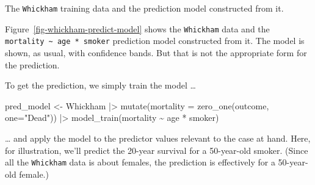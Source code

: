 \documentclass[
  letterpaper,
  DIV=11,
  numbers=noendperiod,
  oneside]{scrartcl}
\newenvironment{Shaded}{\begin{snugshade}}{\end{snugshade}}
\newcommand{\AttributeTok}[1]{\textcolor[rgb]{0.40,0.45,0.13}{#1}}
\newcommand{\FunctionTok}[1]{\textcolor[rgb]{0.28,0.35,0.67}{#1}}
\newcommand{\NormalTok}[1]{\textcolor[rgb]{0.00,0.23,0.31}{#1}}
\newcommand{\OtherTok}[1]{\textcolor[rgb]{0.00,0.23,0.31}{#1}}
\newcommand{\SpecialCharTok}[1]{\textcolor[rgb]{0.37,0.37,0.37}{#1}}
\newcommand{\StringTok}[1]{\textcolor[rgb]{0.13,0.47,0.30}{#1}}
\begin{document}
\begin{marginfigure}


\caption{\label{fig-whickham-predict-model}The \texttt{Whickham}
training data and the prediction model constructed from it.}

\end{marginfigure}%

Figure~\ref{fig-whickham-predict-model} shows the \texttt{Whickham} data
and the \texttt{mortality\ \textasciitilde{}\ age\ *\ smoker} prediction
model constructed from it. The model is shown, as usual, with confidence
bands. But that is not the appropriate form for the prediction.

To get the prediction, we simply train the model \ldots{}

\begin{Shaded}
\begin{Highlighting}[]
\NormalTok{pred\_model }\OtherTok{\textless{}{-}}\NormalTok{ Whickham }\SpecialCharTok{|\textgreater{}} 
  \FunctionTok{mutate}\NormalTok{(}\AttributeTok{mortality =} \FunctionTok{zero\_one}\NormalTok{(outcome, }\AttributeTok{one=}\StringTok{"Dead"}\NormalTok{)) }\SpecialCharTok{|\textgreater{}} 
  \FunctionTok{model\_train}\NormalTok{(mortality }\SpecialCharTok{\textasciitilde{}}\NormalTok{ age }\SpecialCharTok{*}\NormalTok{ smoker)}
\end{Highlighting}
\end{Shaded}

\ldots{} and apply the model to the predictor values relevant to the
case at hand. Here, for illustration, we'll predict the 20-year survival
for a 50-year-old smoker. (Since all the \texttt{Whickham} data is about
females, the prediction is effectively for a 50-year-old female.)
\end{document}
